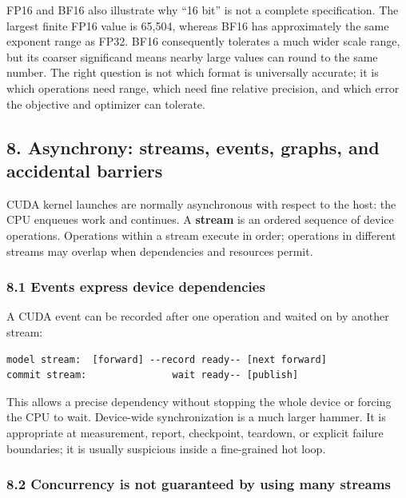 \documentclass[
  10pt,
  letterpaper,
]{article}
\begin{document}
FP16 and BF16 also illustrate why ``16 bit'' is not a complete
specification. The largest finite FP16 value is 65,504, whereas BF16 has
approximately the same exponent range as FP32. BF16 consequently
tolerates a much wider scale range, but its coarser significand means
nearby large values can round to the same number. The right question is
not which format is universally accurate; it is which operations need
range, which need fine relative precision, and which error the objective
and optimizer can tolerate.

\subsection{8. Asynchrony: streams, events, graphs, and accidental
barriers}\label{8-asynchrony-streams-events-graphs-and-accidental-barriers}

CUDA kernel launches are normally asynchronous with respect to the host:
the CPU enqueues work and continues. A \textbf{stream} is an ordered
sequence of device operations. Operations within a stream execute in
order; operations in different streams may overlap when dependencies and
resources permit.

\subsubsection{8.1 Events express device
dependencies}\label{81-events-express-device-dependencies}

A CUDA event can be recorded after one operation and waited on by
another stream:

\begin{verbatim}
model stream:  [forward] --record ready-- [next forward]
commit stream:               wait ready-- [publish]
\end{verbatim}

This allows a precise dependency without stopping the whole device or
forcing the CPU to wait. Device-wide synchronization is a much larger
hammer. It is appropriate at measurement, report, checkpoint, teardown,
or explicit failure boundaries; it is usually suspicious inside a
fine-grained hot loop.

\subsubsection{8.2 Concurrency is not guaranteed by using many
streams}\label{82-concurrency-is-not-guaranteed-by-using-many-streams}
\end{document}
